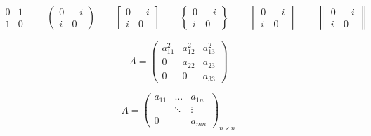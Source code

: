 \documentclass{ctexart}%
\begin{document}
	\[
	\begin{matrix}
	0 & 1\\
	1 & 0
	\end{matrix} \qquad
	\begin{pmatrix}
	0 & -i\\
	i & 0
	\end{pmatrix} \qquad
	\begin{bmatrix}
	0 & -i\\
	i & 0
	\end{bmatrix} \qquad
	\begin{Bmatrix}
	0 & -i\\
	i & 0
	\end{Bmatrix} \qquad
	\begin{vmatrix}
	0 & -i\\
	i & 0
	\end{vmatrix} \qquad
	\begin{Vmatrix}
	0 & -i\\
	i & 0
	\end{Vmatrix} 
	\]
	
	\[
	A = \begin{pmatrix}
	a_{11}^2 & a_{12}^2 & a_{13}^2 \\
	0 & a_{22} & a_{23} \\
	0 & 0 & a_{33}
	\end{pmatrix}
	\]
	
	\[
	A = \begin{pmatrix}
	a_{11} & \dots & a_{1n} \\
	& \ddots & \vdots \\
	0 & & a_{mn}
	\end{pmatrix}_{n \times n}%
	\]
	
\end{document}
